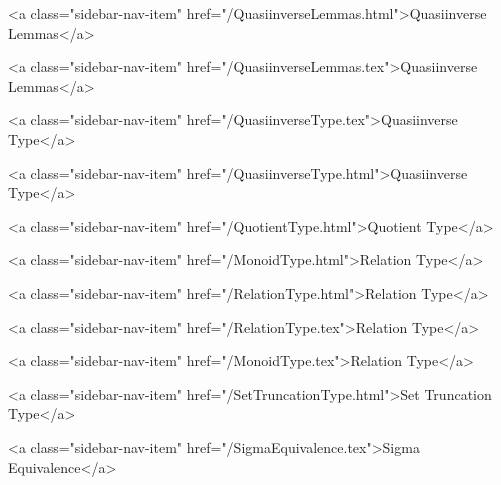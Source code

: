       
    
      
        
          <a class="sidebar-nav-item" href="/QuasiinverseLemmas.html">Quasiinverse Lemmas</a>
        
      
    
      
        
          <a class="sidebar-nav-item" href="/QuasiinverseLemmas.tex">Quasiinverse Lemmas</a>
        
      
    
      
        
          <a class="sidebar-nav-item" href="/QuasiinverseType.tex">Quasiinverse Type</a>
        
      
    
      
        
          <a class="sidebar-nav-item" href="/QuasiinverseType.html">Quasiinverse Type</a>
        
      
    
      
        
          <a class="sidebar-nav-item" href="/QuotientType.html">Quotient Type</a>
        
      
    
      
        
          <a class="sidebar-nav-item" href="/MonoidType.html">Relation Type</a>
        
      
    
      
        
          <a class="sidebar-nav-item" href="/RelationType.html">Relation Type</a>
        
      
    
      
        
          <a class="sidebar-nav-item" href="/RelationType.tex">Relation Type</a>
        
      
    
      
        
          <a class="sidebar-nav-item" href="/MonoidType.tex">Relation Type</a>
        
      
    
      
        
          <a class="sidebar-nav-item" href="/SetTruncationType.html">Set Truncation Type</a>
        
      
    
      
        
          <a class="sidebar-nav-item" href="/SigmaEquivalence.tex">Sigma Equivalence</a>
        
